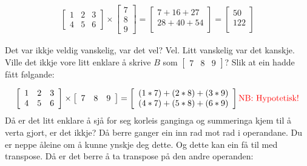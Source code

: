 \documentclass[12pt]{article}
\newcommand\x{\times}
\begin{document}
\begin{gather*}
\left[ 
\begin{array}{ccc}
1 & 2 & 3 \\
4 & 5 & 6
\end{array}
 \right] \x
\left[ 
\begin{array}{ccc}
7 \\ 8 \\ 9
\end{array}
\right] =
\left[ 
\begin{array}{ccc}
7 + 16 + 27 \\
28 + 40 + 54 \\
\end{array}
\right] =
\left[ 
\begin{array}{ccc}
50 \\
122 \\
\end{array}
\right]
\end{gather*}

Det var ikkje veldig vanskelig, var det vel?
Vel. Litt vanskelig var det kanskje. 
Ville det ikkje vore litt enklare å skrive $B$ som $\left[ \begin{array}{ccc}7 &
                                                                                 8
                                                                                 &
                                                                                   9
\end{array}\right]$? Slik at ein hadde fått følgande:

\begin{gather*}
\left[ 
\begin{array}{ccc}
1 & 2 & 3 \\
4 & 5 & 6
\end{array}
 \right] \x
\left[ 
\begin{array}{ccc}
7 & 8 & 9
\end{array}
\right] =
\left[ 
\begin{array}{ccc}
(1*7) + (2*8) + (3*9) \\
(4*7) + (5*8) + (6*9) \\
\end{array}
\right]
\text{\color{red} NB: Hypotetisk!}
\end{gather*}
Då er det litt enklare å sjå for seg korleis ganginga og summeringa 
kjem til å verta gjort, 
er det ikkje? Då berre ganger ein inn rad mot rad i operandane.
Du er neppe åleine om å kunne ynskje deg dette.
Og dette kan ein få til med transpose. Då er det berre å ta transpose på
den andre operanden:
\end{document}
